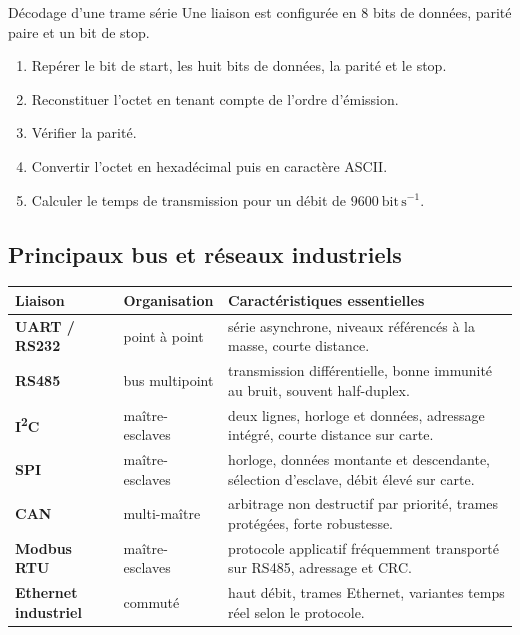 \begin{TLLogicApplication}{Décodage d'une trame série}
Une liaison est configurée en 8 bits de données, parité paire et un bit de stop.
\begin{enumerate}
  \item Repérer le bit de start, les huit bits de données, la parité et le stop.
  \item Reconstituer l'octet en tenant compte de l'ordre d'émission.
  \item Vérifier la parité.
  \item Convertir l'octet en hexadécimal puis en caractère ASCII.
  \item Calculer le temps de transmission pour un débit de $9600\ \mathrm{bit\,s^{-1}}$.
\end{enumerate}
\end{TLLogicApplication}

\subsection{Principaux bus et réseaux industriels}

\begin{center}
\small
\begin{tabularx}{\linewidth}{>{\bfseries}p{2.2cm}p{2.3cm}X}
\toprule
Liaison & Organisation & Caractéristiques essentielles \\
\midrule
UART / RS232 & point à point & série asynchrone, niveaux référencés à la masse, courte distance.\\
RS485 & bus multipoint & transmission différentielle, bonne immunité au bruit, souvent half-duplex.\\
I\textsuperscript{2}C & maître-esclaves & deux lignes, horloge et données, adressage intégré, courte distance sur carte.\\
SPI & maître-esclaves & horloge, données montante et descendante, sélection d'esclave, débit élevé sur carte.\\
CAN & multi-maître & arbitrage non destructif par priorité, trames protégées, forte robustesse.\\
Modbus RTU & maître-esclaves & protocole applicatif fréquemment transporté sur RS485, adressage et CRC.\\
Ethernet industriel & commuté & haut débit, trames Ethernet, variantes temps réel selon le protocole.\\
\bottomrule
\end{tabularx}
\end{center}

